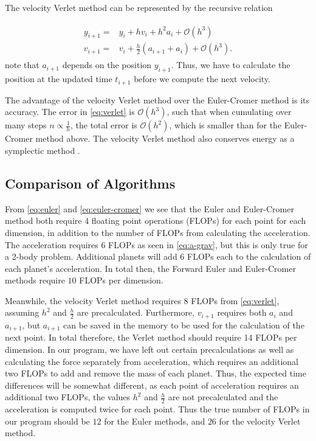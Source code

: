 \documentclass[../main.tex]{subfiles}
\begin{document}
The velocity Verlet method can be represented by the recursive relation

\begin{align}
    \begin{split}
    y_{i+1} = & y_i+h v_i+h^2 a_i + \mathcal{O}(h^3) \\
    v_{i+1} = & v_i+\frac{h}{2}(a_{i+1}+a_i)+\mathcal{O}(h^3).
    \end{split}
    \label{eq:verlet}
\end{align} note that \ensuremath{a_{i+1}} depends on the position \ensuremath{y_{i+1}}. Thus, we have to calculate the position at the updated time \ensuremath{t_{i+1}} before we compute the next velocity. 

The advantage of the velocity Verlet method over the Euler-Cromer method is its accuracy. The error in \cref{eq:verlet} is $\mathcal{O}(h^3)$, such that when cumulating over many steps $n \propto \frac{1}{h}$, the total error is $\mathcal{O}(h^2)$, which is smaller than for the Euler-Cromer method above. The velocity Verlet method also conserves energy as a symplectic method \cite{Verlet1967}.

\iffalse
\begin{algorithm}[H]
\SetAlgoLined
 
 \caption{Velocity Verlet}
\end{algorithm}
\fi

\subsection{Comparison of Algorithms}

From \cref{eq:euler} and \cref{eq:euler-cromer} we see that the Euler and Euler-Cromer method both require $4$ floating point operations (FLOPs) for each point for each dimension, in addition to the number of FLOPs from calculating the acceleration. The acceleration requires $6$ FLOPs as seen in \cref{eq:a-grav}, but this is only true for a 2-body problem. Additional planets will add $6$ FLOPs each to the calculation of each planet's acceleration. In total then, the Forward Euler and Euler-Cromer methods require $10$ FLOPs per dimension.

Meanwhile, the velocity Verlet method requires $8$ FLOPs from \cref{eq:verlet}, assuming $h^2$ and $\frac{h}{2}$ are precalculated. Furthermore, $v_{i+1}$ requires both $a_{i}$ and $a_{i+1}$, but $a_{i+1}$ can be saved in the memory to be used for the calculation of the next point. In total therefore, the Verlet method should require 14 FLOPs per dimension. In our program, we have left out certain precalculations as well as calculating the force separately from acceleration, which requires an additional two FLOPs to add and remove the mass of each planet. Thus, the expected time differences will be somewhat different, as each point of acceleration requires an additional two FLOPs, the values $h^2$ and $\frac{h}{2}$ are not precalculated and the acceleration is computed twice for each point. Thus the true number of FLOPs in our program should be $12$ for the Euler methods, and $26$ for the velocity Verlet method.
\end{document}
